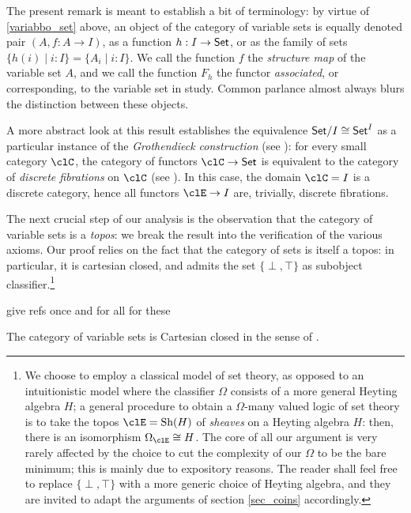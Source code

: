 \begin{notation}
	The present remark is meant to establish a bit of terminology: by virtue of \autoref{variabbo_set} above, an object of the category of variable sets is equally denoted pair $(A,f : A \to I)$, as a function $h : I \to \mathsf{Set}$, or as the family of sets $\{h(i) \mid i : I\} = \{A_i\mid i: I\}$. We call the function $f$ the \emph{structure map} of the variable set $A$, and we call the function $F_h$ the functor \emph{associated}, or corresponding, to the variable set in study. Common parlance almost always blurs the distinction between these objects.
\end{notation}
\begin{remark}
	A more abstract look at this result establishes the equivalence $\mathsf{Set}/I\cong \mathsf{Set}^I$ as a particular instance of the \emph{Grothendieck construction} (see \cite[1.1]{Leinster2004}): for every small category $\clC$, the category of functors $\clC\to\Set$ is equivalent to the category of \emph{discrete fibrations} on $\clC$ (see \cite[1.1]{Leinster2004}). In this case, the domain $\clC=I$ is a discrete category, hence all functors $\clE \to I$ are, trivially, discrete fibrations.
\end{remark}
\begin{remark}
	The next crucial step of our analysis is the observation that the category of variable sets is a \emph{topos}: we break the result into the verification of the various axioms. Our proof relies on the fact that the category of sets is itself a topos: in particular, it is cartesian closed, and admits the set $\{\perp,\top\}$ as subobject classifier.\footnote{We choose to employ a classical model of set theory, as opposed to an intuitionistic model where the classifier $\Omega$ consists of a more general Heyting algebra $H$; a general procedure to obtain a $\Omega$-many valued logic of set theory is to take the topos $\clE = \text{Sh}(H)$ of \emph{sheaves} on a Heyting algebra $H$: then, there is an isomorphism $\Omega_\clE\cong H$. The core of all our argument is very rarely affected by the choice to cut the complexity of our $\Omega$ to be the bare minimum; this is mainly due to expository reasons. The reader shall feel free to replace $\{\perp,\top\}$ with a more generic choice of Heyting algebra, and they are invited to adapt the arguments of section \autoref{sec_coins} accordingly.}
\end{remark}
{\color{red} give refs once and for all for these}
\begin{proposition}\label{carclo}
	The category of variable sets is Cartesian closed in the sense of \cite[p.335]{Bor1}.
\end{proposition}
